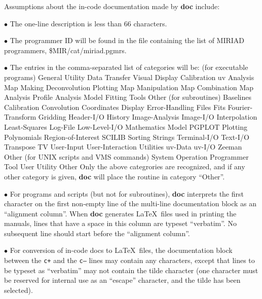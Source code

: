 Assumptions about the in-code documentation made by {\bf doc} include:

\item{$\bullet$} The one-line description is less than 66 characters.

\item{$\bullet$} The programmer ID will be found in the file containing
the list of MIRIAD programmers, \$MIR/cat/miriad.pgmrs.

\item{$\bullet$} {\parskip=0.0in The entries in the comma-separated list of
categories will be: \newline
\vskip 0.1in
(for executable programs)
{\ninepoint\begintt
 General             Utility             Data Transfer       Visual Display
 Calibration         uv Analysis         Map Making          Deconvolution
 Plotting            Map Manipulation    Map Combination     Map Analysis
 Profile Analysis    Model Fitting       Tools               Other
\endtt}
(for subroutines)
{\ninepoint\begintt
 Baselines           Calibration         Convolution         Coordinates
 Display             Error-Handling      Files               Fits
 Fourier-Transform   Gridding            Header-I/O          History
 Image-Analysis      Image-I/O           Interpolation       Least-Squares
 Log-File            Low-Level-I/O       Mathematics         Model
 PGPLOT              Plotting            Polynomials         Region-of-Interest
 SCILIB              Sorting             Strings             Terminal-I/O
 Text-I/O            Transpose           TV                  User-Input
 User-Interaction    Utilities           uv-Data             uv-I/O
 Zeeman              Other
\endtt}
(for UNIX scripts and VMS commands)
{\ninepoint\begintt
 System Operation    Programmer Tool     User Utility        Other
\endtt}
Only the above categrories are recognized, and if any other category is
given, {\bf doc} will place the routine in category ``Other''.
}
\item{$\bullet$} For programs and scripts (but not for subroutines),
{\bf doc} interprets the first character on the first non-empty line of the
multi-line documentation block as an ``alignment column''.  When {\bf doc}
generates \LaTeX\ files used in printing the manuals, lines that have a
space in this column are typeset ``verbatim''.  No subsequent line should
start before the ``alignment column''.

\item{$\bullet$} For conversion of in-code docs to \LaTeX\ files, the
documentation block between the {\tt c+} and the {\tt c--} lines may
contain any characters, except that lines to be typeset as ``verbatim''
may not contain the tilde character (one character must be reserved for
internal use as an  ``escape'' character, and the tilde has been
selected).

